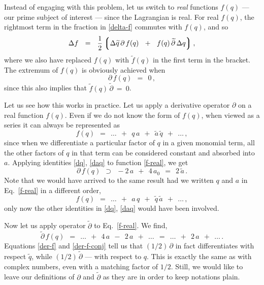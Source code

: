 \documentclass[epsfig,12pt]{article}
\newcommand{\p}{\partial}
\newcommand{\wt}{\widetilde}
\newcommand{\lgr}{\left\lgroup}
\newcommand{\rgr}{\right\rgroup}
\begin{document}
	Instead of engaging with this problem, let us switch to \emph{real} functions $ f(q) $ ---
	our prime subject of interest --- since the Lagrangian is real.
	For real $ f(q) $, the rightmost term in the fraction in \eqref{delta-f} commutes with $ f(q) $,
	and so
\[
	\Delta f	~~=~~	\frac 1 2 \lgr \Delta \wt q\, \p\, f(q)  ~~+~~  f(q)\, \wt \p\, \Delta q \rgr,
\]
	where we also have replaced $ f(q) $ with $ \wt f(q) $ in the first term in the bracket.
	The extremum of $ f(q) $ is obviously achieved when
\begin{equation}
	\p\,f(q)	~~=~~	0\,,
\end{equation}
	since this also implies that $ \wt f(q)\, \wt \p ~=~ 0 $.

	Let us see how this works in practice.
	Let us apply a derivative operator $ \p $ on a real function $ f(q) $.
	Even if we do not know the form of $ f(q) $, when viewed as a series it can always be represented as
\begin{equation}
\label{f-real}
	f(q)		~~=~~	\dots  ~~+~~  q\,a  ~~+~~  \wt a\, \wt q  ~~+~~  \dots\,,
\end{equation}
	since when we differentiate a particular factor of $ q $ in a given monomial term,
	all the other factors of $ q $ in that term can be considered constant and absorbed into $ a $.
	Applying identities \eqref{dq}, \eqref{daq} to function \eqref{f-real}, we get
\begin{equation}
\label{der-f}
	\p\, f(q)	~~\supset~~	-2\,a  ~~+~~  4\,a_0	~~=~~	2\,\wt a\,.
\end{equation}
	Note that we would have arrived to the same result had we written $ q $ and $ a $ in Eq.~\eqref{f-real}
	in a different order,
\begin{equation}
	f(q)		~~=~~	\dots  ~~+~~  a\,q  ~~+~~  \wt q\, \wt a  ~~+~~  \dots\,,
\end{equation}
	only now the other identities in \eqref{dq}, \eqref{daq} would have been involved.

	Now let us apply operator $ \wt\p $ to Eq.~\eqref{f-real}.
	We find,
\begin{equation}
\label{der-f-conj}
	\wt \p\, f(q)	~~=~~	\dots  ~~+~~  4\,a  ~~-~~  2\,a  ~~+~~  \dots	
			~~=~~	\dots  ~~+~~  2\,a  ~~+~~  \dots\,.
\end{equation}
	Equations \eqref{der-f} and \eqref{der-f-conj} tell us that $ (1/2)\,\p $ in fact differentiates
	with respect $ \wt q $, while $ (1/2)\,\wt \p $ --- with respect to $ q $.
	This is exactly the same as with complex numbers, even with a matching factor of $ 1/2 $.
	Still, we would like to leave our definitions of $ \p $ and $ \wt \p $ as they are
	in order to keep notations plain.
\end{document}
